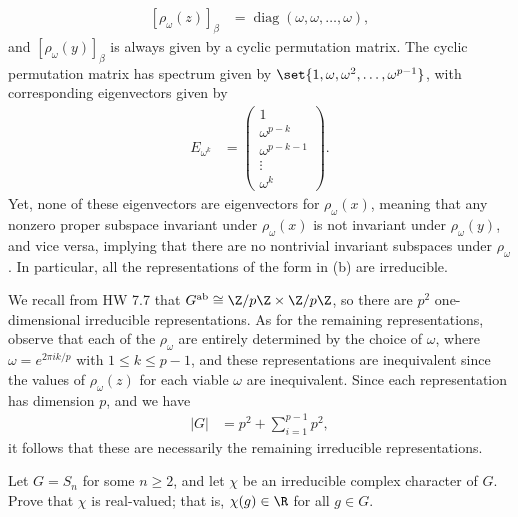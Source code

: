 \documentclass[10pt]{mypackage}
\begin{document}
\begin{solution}
\begin{enumerate}[(a)]
\begin{align*}
        \left[ \rho_{\omega}\left( z \right) \right]_{\beta} &= \operatorname{diag}\left( \omega,\omega,\dots,\omega \right),
      \end{align*}
      and $\left[ \rho_{\omega}(y) \right]_{\beta}$ is always given by a cyclic permutation matrix. The cyclic permutation matrix has spectrum given by $\set{1,\omega,\omega^2,\dots,\omega^{p-1}}$, with corresponding eigenvectors given by
      \begin{align*}
        E_{\omega^{k}} &= \begin{pmatrix}1\\\omega^{p-k}\\\omega^{p-k-1}\\\vdots\\\omega^{k}\end{pmatrix}.
      \end{align*}
      Yet, none of these eigenvectors are eigenvectors for $\rho_{\omega}(x)$, meaning that any nonzero proper subspace invariant under $\rho_{\omega}(x)$ is not invariant under $\rho_{\omega}(y)$, and vice versa, implying that there are no nontrivial invariant subspaces under $\rho_{\omega}$. In particular, all the representations of the form in (b) are irreducible.

      We recall from HW 7.7 that $G^{\operatorname{ab}}\cong \Z/p\Z\times\Z/p\Z$, so there are $p^2$ one-dimensional irreducible representations. As for the remaining representations, observe that each of the $\rho_{\omega}$ are entirely determined by the choice of $\omega$, where $\omega = e^{2\pi i k/p}$ with $1\leq k \leq p-1$, and these representations are inequivalent since the values of $\rho_{\omega}(z)$ for each viable $\omega$ are inequivalent. Since each representation has dimension $p$, and we have
      \begin{align*}
        \left\vert G \right\vert &= p^2 + \sum_{i=1}^{p-1}p^2,
      \end{align*}
      it follows that these are necessarily the remaining irreducible representations.
  \end{enumerate}
\end{solution}
\begin{problem}[Problem 3]
  Let $G = S_n$ for some $n\geq 2$, and let $\chi$ be an irreducible complex character of $G$. Prove that $\chi$ is real-valued; that is, $\chi(g) \in \R$ for all $g\in G$.
\end{problem}
\end{document}
